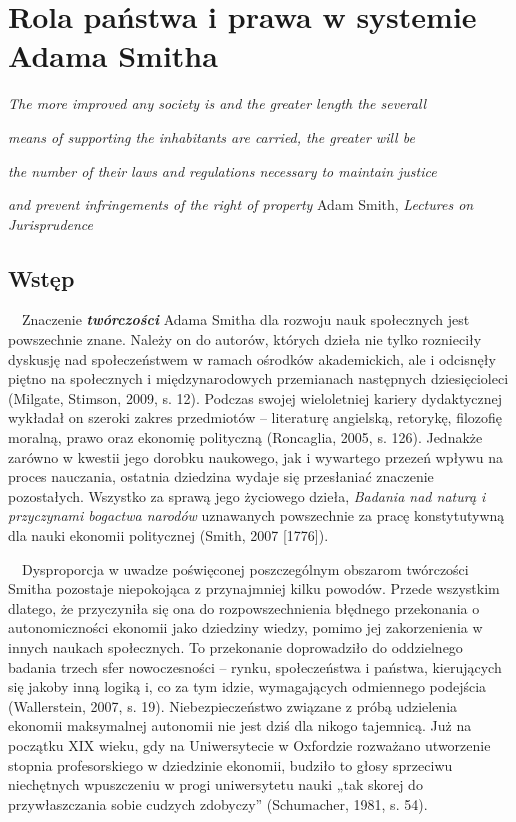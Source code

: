 \documentclass[a4paper]{article}
\title{}
\newcommand\textstyleFootnoteCharacters[1]{\textsuperscript{#1}}
\begin{document}
\section{Rola państwa i prawa w systemie Adama Smitha}
{\raggedleft\itshape
The more improved any society is and the greater length the severall
\par}

{\raggedleft\itshape
means of supporting the inhabitants are carried, the greater will be 
\par}

{\raggedleft\itshape
the number of their laws and regulations necessary to maintain justice 
\par}

{\raggedleft
\textit{and prevent infringements of the right of property}\textstyleFootnoteCharacters{\textit{ }}Adam Smith, \textit{Lectures on Jurisprudence}\textbf{       }
\par}

\subsection{Wstęp}
                     \ \ Znaczenie \textit{\textbf{twórczości}} Adama Smitha dla rozwoju nauk społecznych jest powszechnie znane. Należy on do autorów, których dzieła nie tylko roznieciły dyskusję nad społeczeństwem w ramach ośrodków akademickich, ale i odcisnęły piętno na społecznych i międzynarodowych przemianach następnych dziesięcioleci \label{ref:RND1WL5POjFQ5}(Milgate, Stimson, 2009, s. 12). Podczas swojej wieloletniej kariery dydaktycznej wykładał on szeroki zakres przedmiotów – literaturę angielską, retorykę, filozofię moralną, prawo oraz ekonomię polityczną \label{ref:RNDAE89MTXX6x}(Roncaglia, 2005, s. 126). Jednakże zarówno w kwestii jego dorobku naukowego, jak i wywartego przezeń wpływu na proces nauczania, ostatnia dziedzina wydaje się przesłaniać znaczenie pozostałych. Wszystko za sprawą jego życiowego dzieła, \textit{Badania nad naturą i przyczynami bogactwa narodów }uznawanych powszechnie za pracę konstytutywną dla nauki ekonomii politycznej \label{ref:RNDezUk1QStk4}(Smith, 2007 [1776]). 

 \ \ Dysproporcja w uwadze poświęconej poszczególnym obszarom twórczości Smitha pozostaje niepokojąca z przynajmniej kilku powodów. Przede wszystkim dlatego, że przyczyniła się ona do rozpowszechnienia błędnego przekonania o autonomiczności ekonomii jako dziedziny wiedzy, pomimo jej zakorzenienia w innych naukach społecznych. To przekonanie doprowadziło do oddzielnego badania trzech sfer nowoczesności – rynku, społeczeństwa i państwa, kierujących się jakoby inną logiką i, co za tym idzie, wymagających odmiennego podejścia \label{ref:RNDxEklb6Rjec}(Wallerstein, 2007, s. 19). Niebezpieczeństwo związane z próbą udzielenia ekonomii maksymalnej autonomii nie jest dziś dla nikogo tajemnicą. Już na początku XIX wieku, gdy na Uniwersytecie w Oxfordzie rozważano utworzenie stopnia profesorskiego w dziedzinie ekonomii, budziło to głosy sprzeciwu niechętnych wpuszczeniu w progi uniwersytetu nauki „tak skorej do przywłaszczania sobie cudzych zdobyczy” \label{ref:RNDq88dfFYNSw}(Schumacher, 1981, s. 54). 
\end{document}
